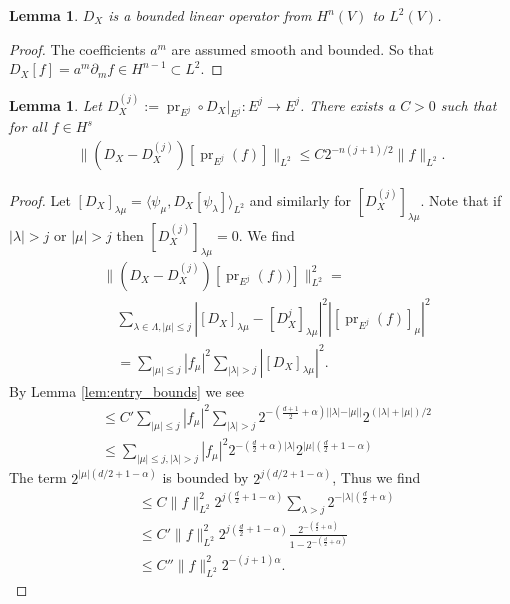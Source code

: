 \documentclass[letterpaper, 10 pt, conference]{ieeeconf}
\newtheorem{lem}[thm]{Lemma}
\DeclareMathOperator{\pr}{pr}
\begin{document}
\begin{lem} \label{lem:DX_is_bounded}
  $D_X$ is a bounded linear operator from $H^n(V)$ to $L^2(V)$.
\end{lem}
\begin{proof}
  The coefficients $a^m$ are assumed smooth and bounded.
  So that $D_X [f] = a^m \partial_m f \in H^{n-1} \subset L^2$.
\end{proof}

\begin{lem}  \label{lem:L2_to_Hn}
  Let $D_X^{(j)} := \pr_{E^j} \circ \left. D_X \right|_{E^j} : E^j \to E^j$.
  There exists a $C>0$ such that for all $f \in H^s$
  \begin{align}
    \| (D_X - D_X^{(j)})[\pr_{E^j}(f)] \|_{L^2} \leq C 2^{-n(j+1)/2} \| f\|_{L^2}.
  \end{align}
\end{lem}
\begin{proof}
  Let $[D_X]_{\lambda\mu} = \langle \psi_{\mu} , D_X[\psi_\lambda] \rangle_{L^2}$
and similarly for $[D_X^{(j)}]_{\lambda \mu}$.
Note that if $|\lambda|>j$ or $|\mu |>j$ then $[D_X^{(j)}]_{\lambda\mu} = 0$.
We find
  \begin{align*}
    &\| (D_X - D_X^{(j)}) [\pr_{E^j}(f))] \|^2_{L^2} = \\
    &\quad \sum_{\lambda \in \Lambda, |\mu | \leq j} \left| [D_X]_{\lambda\mu} - [D_X^j]_{\lambda\mu} \right|^2 |[ \pr_{E^j}(f)]_\mu|^2 \\
    &\quad = \sum_{|\mu|\leq j}| f_\mu |^2 \sum_{|\lambda| > j} | [D_X]_{\lambda\mu}|^2.
  \end{align*}
  By Lemma \ref{lem:entry_bounds} we see
  \begin{align*}
    &\leq C' \sum_{|\mu|\leq j} | f_\mu |^2  \sum_{|\lambda| > j } 
    2^{- \left( \frac{d+1}{2} + \alpha \right) | |\lambda| - |\mu| |}
    2^{ (|\lambda| + |\mu|)/2 }\\
    &\leq \sum_{|\mu | \leq j , |\lambda| > j}
    |f_\mu|^2 2^{ - \left( \frac{d}{2} + \alpha \right)|\lambda|} 
    2^{|\mu|\left(\frac{d}{2} + 1 - \alpha\right) }
  \end{align*}
  The term $2^{|\mu|( d/2 + 1 - \alpha)}$ is bounded 
  by $ 2^{j(d/2 + 1 - \alpha)}$,
  Thus we find
  \begin{align*}
    &\leq C \|f\|_{L^2}^2 2^{j \left( \frac{d}{2} + 1 - \alpha\right)} \sum_{\lambda > j}
      2^{-|\lambda|\left( \frac{d}{2} + \alpha\right)} \\
    &\leq C' \|f\|_{L^2}^2 2^{j \left( \frac{d}{2} + 1 - \alpha\right)}
    \frac{ 2^{ -\left(\frac{d}{2} + \alpha \right)}}{ 1 - 2^{-\left(\frac{d}{2} + \alpha\right)}} \\
    &\leq C'' \|f\|_{L^2}^2 2^{-(j+1) \alpha}.
  \end{align*}
\end{proof}
\end{document}
